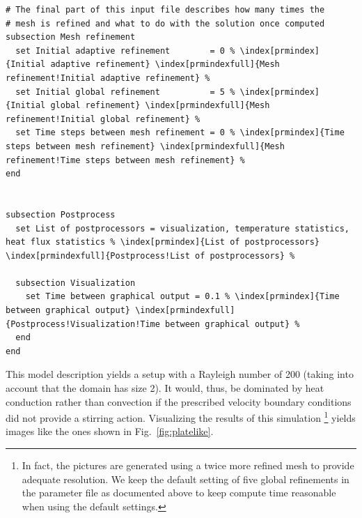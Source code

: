 \documentclass{article}
\begin{document}
\begin{lstlisting}[frame=single,language=prmfile,escapechar=\%]
# The final part of this input file describes how many times the
# mesh is refined and what to do with the solution once computed
subsection Mesh refinement
  set Initial adaptive refinement        = 0 % \index[prmindex]{Initial adaptive refinement} \index[prmindexfull]{Mesh refinement!Initial adaptive refinement} %
  set Initial global refinement          = 5 % \index[prmindex]{Initial global refinement} \index[prmindexfull]{Mesh refinement!Initial global refinement} %
  set Time steps between mesh refinement = 0 % \index[prmindex]{Time steps between mesh refinement} \index[prmindexfull]{Mesh refinement!Time steps between mesh refinement} %
end


subsection Postprocess
  set List of postprocessors = visualization, temperature statistics, heat flux statistics % \index[prmindex]{List of postprocessors} \index[prmindexfull]{Postprocess!List of postprocessors} %

  subsection Visualization
    set Time between graphical output = 0.1 % \index[prmindex]{Time between graphical output} \index[prmindexfull]{Postprocess!Visualization!Time between graphical output} %
  end
end
\end{lstlisting}

This model description yields a setup with a Rayleigh number of 200 (taking
into account that the domain has size 2). It would, thus, be dominated by heat
conduction rather than convection if the prescribed velocity boundary conditions
did not provide a stirring action. Visualizing the results of this simulation%
\footnote{In fact, the pictures are generated using a twice more refined mesh
to provide adequate resolution. We keep the default setting of five
global refinements in the parameter file as documented above to keep compute
time reasonable when using the default settings.}
yields images like the ones shown in Fig.~\ref{fig:platelike}.
\end{document}
